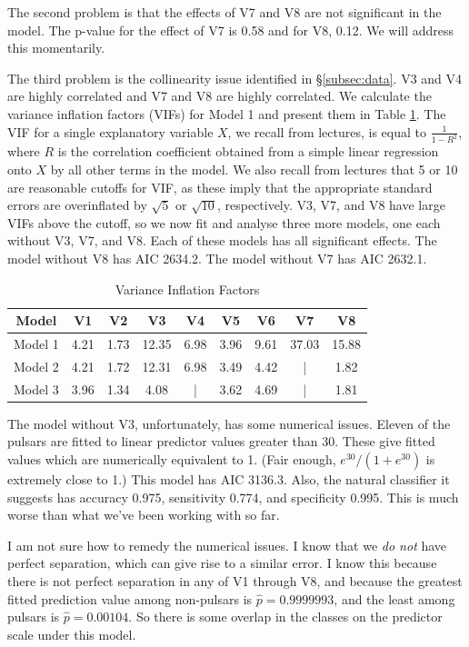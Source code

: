 \documentclass[11pt, oneside]{article}
\begin{document}
The second problem is that the effects of V7 and V8 are not significant in the model. The p-value for the effect of V7 is 0.58 and for V8, 0.12. We will address this momentarily. 

The third problem is the collinearity issue identified in \S\ref{subsec:data}. V3 and V4 are highly correlated and V7 and V8 are highly correlated. We calculate the variance inflation factors (VIFs) for Model 1 and present them in Table \ref{table:vif}. The VIF for a single explanatory variable $X$, we recall from lectures, is equal to $\frac{1}{1-R^2}$, where $R$ is the correlation coefficient obtained from a simple linear regression onto $X$ by all other terms in the model. We also recall from lectures that 5 or 10 are reasonable cutoffs for VIF, as these imply that the appropriate standard errors are overinflated by $\sqrt{5}$ or $\sqrt{10}$, respectively. V3, V7, and V8 have large VIFs above the cutoff, so we now fit and analyse three more models, one each without V3, V7, and V8. Each of these models has all significant effects. The model without V8 has AIC 2634.2. The model without V7 has AIC 2632.1. 

\begin{table}[h!]
\centering
\begin{tabular}{|c | c c c c c c c c|} 
 \hline
  Model & V1  &  V2 &  V3 &   V4 &   V5&    V6  &  V7  &  V8 \\
  \hline
  \hline
Model 1&  4.21 & 1.73 & 12.35 & 6.98 & 3.96 & 9.61& 37.03 &15.88 \\
Model 2 & 4.21 & 1.72 & 12.31 & 6.98 & 3.49 & 4.42 & | &1.82 \\
Model 3 & 3.96 & 1.34 & 4.08 & | & 3.62 & 4.69 & | &  1.81 \\
  \hline
\end{tabular}
\caption{Variance Inflation Factors}
\label{table:vif}
\end{table}


The model without V3, unfortunately, has some numerical issues. Eleven of the pulsars are fitted to linear predictor values greater than 30. These give fitted values which are numerically equivalent to 1. (Fair enough, $e^{30} / (1 + e^{30})$ is extremely close to 1.) This model has AIC 3136.3. Also, the natural classifier it suggests has accuracy 0.975, sensitivity 0.774, and specificity 0.995. This is much worse than what we've been working with so far. 

I am not sure how to remedy the numerical issues. I know that we \emph{do not} have perfect separation, which can give rise to a similar error. I know this because there is not perfect separation in any of V1 through V8, and because the greatest fitted prediction value among non-pulsars is $\hat{p} = 0.9999993$, and the least among pulsars is $\hat{p} = 0.00104$. So there is some overlap in the classes on the predictor scale under this model. 
\end{document}
